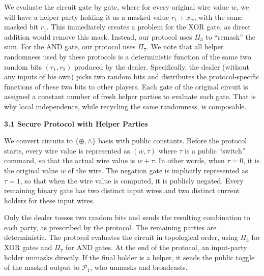 We evaluate the circuit gate by gate, where for every original wire value $w$, we will have a helper party holding it as a masked value $r_{1}+x_{w}$, with the same masked bit $r_{1}$. This immediately creates a problem for the XOR gate, as direct addition would remove this mask. Instead, our protocol uses $\Pi_{3}$ to “remask” the sum. For the AND gate, our protocol uses $\Pi_{7}$. We note that all helper randomness used by these protocols is a deterministic function of the same two random bits $(r_{1},r_{2})$ produced by the dealer. Specifically, the dealer (without any inputs of his own) picks two random bits and distributes the protocol-specific functions of these two bits to other players. Each gate of the original circuit is assigned a constant number of fresh helper parties to evaluate each gate. That is why local independence, while recycling the same randomness, is composable.\par




\par\medskip\noindent\textbf{
3.1 Secure Protocol with Helper Parties}\par




We convert circuits to $\{\oplus,\wedge\}$ basis with public constants. Before the protocol starts, every wire value is represented as $(w,\tau)$ where $\tau$ is a public “switch” command, so that the actual wire value is $w+\tau$. In other words, when $\tau=0$, it is the original value $w$ of the wire. The negation gate is implicitly represented as $\tau=1$, so that when the wire value is computed, it is publicly negated.
Every remaining binary gate has two distinct input wires and two distinct current holders for these input wires.\par




Only the dealer tosses two random bits and sends the resulting combination to each party, as prescribed by the protocol. The remaining parties are deterministic. The protocol evaluates the circuit in topological order, using $\Pi_{3}$ for XOR gates and $\Pi_{7}$ for AND gates. At the end of the protocol, an input-party holder unmasks directly. If the final holder is a helper, it sends the public toggle of the masked output to $\mathcal{P}_{1}$, who unmasks and broadcasts.\par






